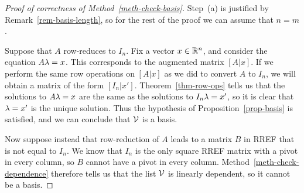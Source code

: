 \documentclass[reqno]{amsart}
\theoremstyle{definition}
\begin{document}
\begin{proof}[Proof of correctness of Method~\ref{meth-check-basis}]
 Step~(a) is justified by Remark~\ref{rem-basis-length}, so for the
 rest of the proof we can assume that $n=m$.

 Suppose that $A$ row-reduces to $I_n$.  Fix a vector $x\in{\mathbb{R}}^n$, and
 consider the equation $A\lambda=x$.  This corresponds to the augmented
 matrix $[A|x]$.  If we perform the same row operations on $[A|x]$ as
 we did to convert $A$ to $I_n$, we will obtain a matrix of the form
 $[I_n|x']$.  Theorem~\ref{thm-row-ops} tells us that the solutions to
 $A\lambda=x$ are the same as the solutions to $I_n\lambda=x'$, so it is clear
 that $\lambda=x'$ is the unique solution.  Thus the hypothesis of
 Proposition~\ref{prop-basis} is satisfied, and we can conclude that
 $\mathcal{V}$ is a basis.

 Now suppose instead that row-reduction of $A$ leads to a matrix $B$
 in RREF that is not equal to $I_n$.  We know that $I_n$ is the only
 square RREF matrix with a pivot in every column, so $B$ cannot have a
 pivot in every column.  Method~\ref{meth-check-dependence} therefore
 tells us that the list $\mathcal{V}$ is linearly dependent, so it cannot be a
 basis.
\end{proof}
\end{document}
